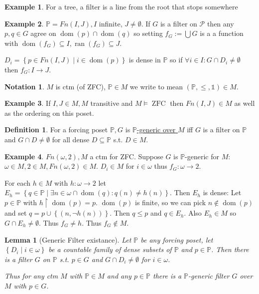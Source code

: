 \documentclass{scrartcl}
\renewcommand{\P}{\mathcal{P}}
\newcommand{\set}[1]{\left\{#1\right\}}
\DeclareMathOperator{\ZFC}{ZFC}
\DeclareMathOperator{\dom}{dom}
\DeclareMathOperator{\ran}{ran}
\theoremstyle{definition}
\newtheorem*{definition*}{Definition}
\newtheorem*{example*}{Example}
\newtheorem*{notation*}{Notation}
\theoremstyle{plain}
\newtheorem*{lemma*}{Lemma}
\theoremstyle{remark}
\begin{document}
	\begin{example*}
		For a tree, a filter is a line from the root that stops somewhere
	\end{example*}

	\begin{example*}
		$\mathbb{P} = Fn(I, J), I$ infinite, $J \neq \emptyset$. If $G$ is a filter on $\P$ then any $p, q \in G$ agree on $\dom(p) \cap \dom(q)$ so setting $f_G := \bigcup G$ is a a function
		with $\dom(f_G) \subseteq I, \ran(f_G) \subseteq J$.
		
		$D_i = \set{p \in Fn(I, J) \mid i \in \dom(p)}$ is dense in $\mathbb{P}$ so if $\forall i \in I: G\cap D_i \neq \emptyset$ then $f_G: I \to J$. 
	\end{example*}

	\begin{notation*}
		$M$ is ctm (of ZFC), $\mathbb{P} \in M$ we write to mean $(\mathbb{P}, \leq, \mathbb{1}) \in M$.
	\end{notation*}

	\begin{example*}
		If $I, J \in M, M$ transitive and $M \vDash \ZFC $ then $Fn(I, J) \in M$ as well as the ordering on this poset.
 	\end{example*}
 
 	\begin{definition*}
 	For a forcing poset $\mathbb{P}, G$ is \underline{$\mathbb{P}$-generic over $M$} iff $G$ is a filter on $\mathbb{P}$ and $G \cap D \neq \emptyset$ for all dense $D \subseteq \mathbb{P}$ s.t. $D \in M$.
 	\end{definition*}
 
 	\begin{example*}
 		$Fn(\omega, 2), M$ a ctm for ZFC. Suppose $G$ is $\mathbb{P}$-generic for $M$: $\omega \in M, 2 \in M, Fn(\omega, 2) \in M$. $D_i \in M$ for $i \in \omega$ thus $f_G: \omega \to 2$.
 		
 		For each $h \in M$ with $h:\omega \to 2$ let $E_h = \set{q \in \mathbb{P} \mid \exists n \in \omega \cap \dom(q): q(n) \neq h(n)}$. Then $E_h$ is dense: Let $p \in \mathbb{P}$ with $h \restriction \dom(p) = p$. $\dom(p)$ is finite, so we can pick $n \notin \dom(p)$ and set $q = p \cup \set{(n, \lnot h(n))}$. Then $q \leq p$ and $q \in E_h$. Also $E_h \in M$ so $G \cap E_h \neq \emptyset$. Thus $f_G \neq h$. Thus $f_G \notin M$. 
 	\end{example*}
 
 	\begin{lemma*}[Generic Filter existance]
 		Let $\mathbb{P}$ be any forcing poset, let $\set{D_i \mid i \in \omega}$ be a countable family of dense subsets of $\mathbb{P}$ and $p \in \mathbb{P}$. Then there is a filter $G$ on $\mathbb{P}$ s.t. $p \in G$ and $G \cap D_i \neq \emptyset$ for $i \in \omega$. 
 		
 		Thus for any ctm $M$ with $\mathbb{P} \in M$ and any $p \in \mathbb{P}$ there is a $\mathbb{P}$-generic filter $G$ over $M$ with $p \in G$.
 	\end{lemma*}
 
\end{document}
